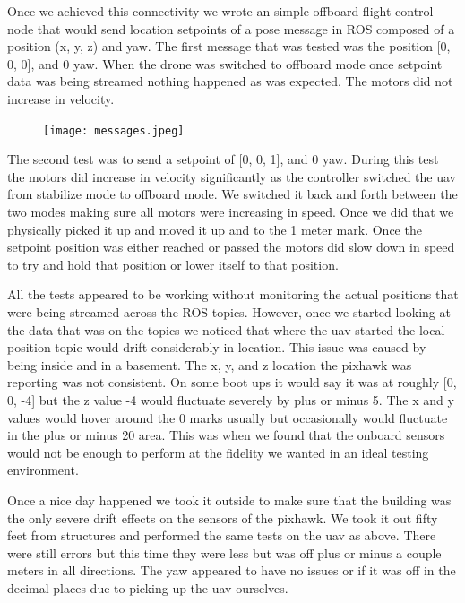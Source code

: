 \begin{itemize}
\begin{itemize}
\noindent Once we achieved this connectivity we wrote an simple offboard flight control node that would send location setpoints of a pose message in ROS composed of a position (x, y, z) and yaw. The first message that was tested was the position [0, 0, 0], and 0 yaw. When the drone was switched to offboard mode once setpoint data was being streamed nothing happened as was expected. The motors did not increase in velocity.\par

\begin{figure} %
    \centering
    \texttt{[image: messages.jpeg]}
\end{figure}

\noindent The second test was to send a setpoint of [0, 0, 1], and 0 yaw. During this test the motors did increase in velocity significantly as the controller switched the uav from stabilize mode to offboard mode. We switched it back and forth between the two modes making sure all motors were increasing in speed. Once we did that we physically picked it up and moved it up and to the 1 meter mark. Once the setpoint position was either reached or passed the motors did slow down in speed to try and hold that position or lower itself to that position.\par

\noindent All the tests appeared to be working without monitoring the actual positions that were being streamed across the ROS topics. However, once we started looking at the data that was on the topics we noticed that where the uav started the local position topic would drift considerably in location. This issue was caused by being inside and in a basement. The x, y, and z location the pixhawk was reporting was not consistent. On some boot ups it would say it was at roughly [0, 0, -4] but the z value -4 would fluctuate severely by plus or minus 5. The x and y values would hover around the 0 marks usually but occasionally would fluctuate in the plus or minus 20 area. This was when we found that the onboard sensors would not be enough to perform at the fidelity we wanted in an ideal testing environment.\par

\noindent Once a nice day happened we took it outside to make sure that the building was the only severe drift effects on the sensors of the pixhawk. We took it out fifty feet from structures and performed the same tests on the uav as above. There were still errors but this time they were less but was off plus or minus a couple meters in all directions. The yaw appeared to have no issues or if it was off in the decimal places due to picking up the uav ourselves.\par 


\end{itemize}
\end{itemize}
